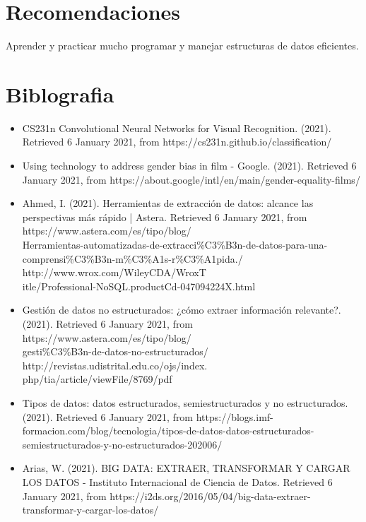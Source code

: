 \documentclass[twoside,twocolumn]{article}
\begin{document}
\section{Recomendaciones}
Aprender y practicar mucho programar y manejar estructuras de datos  eficientes.


\section{Biblografia}

\begin{itemize}
    \item CS231n Convolutional Neural Networks for Visual Recognition. (2021). Retrieved 6 January 2021, from https://cs231n.github.io/classification/ 
    \item Using technology to address gender bias in film - Google. (2021). Retrieved 6 January 2021, from https://about.google/intl/en/main/gender-equality-films/
    \item Ahmed, I. (2021). Herramientas de extracción de datos: alcance las perspectivas más rápido | Astera. Retrieved 6 January 2021, from https://www.astera.com/es/tipo/blog/\\Herramientas-automatizadas-de-extracci\%C3\%B3n-de-datos-para-una-comprensi\%C3\%B3n-m\%C3\%A1s-r\%C3\%A1pida./
    http://www.wrox.com/WileyCDA/WroxT\\itle/Professional-NoSQL.productCd-047094224X.html 
    \item Gestión de datos no estructurados: ¿cómo extraer información relevante?. (2021). Retrieved 6 January 2021, from https://www.astera.com/es/tipo/blog/\\gesti\%C3\%B3n-de-datos-no-estructurados/
    http://revistas.udistrital.edu.co/ojs/index.\\php/tia/article/viewFile/8769/pdf
    \item Tipos de datos: datos estructurados, semiestructurados y no estructurados. (2021). Retrieved 6 January 2021, from https://blogs.imf-formacion.com/blog/tecnologia/tipos-de-datos-datos-estructurados-semiestructurados-y-no-estructurados-202006/
    \item Arias, W. (2021). BIG DATA: EXTRAER, TRANSFORMAR Y CARGAR LOS DATOS - Instituto Internacional de Ciencia de Datos. Retrieved 6 January 2021, from https://i2ds.org/2016/05/04/big-data-extraer-transformar-y-cargar-los-datos/
\end{itemize}

\end{document}
